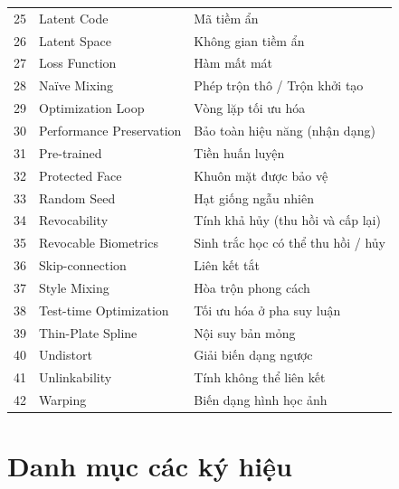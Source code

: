 {\begin{longtable}{r >{\raggedright\arraybackslash}p{5.2cm} >{\raggedright\arraybackslash}p{8.0cm}}
25 & Latent Code & Mã tiềm ẩn \\
26 & Latent Space & Không gian tiềm ẩn \\
27 & Loss Function & Hàm mất mát \\
28 & Na\"ive Mixing & Phép trộn thô / Trộn khởi tạo \\
29 & Optimization Loop & Vòng lặp tối ưu hóa \\
30 & Performance Preservation & Bảo toàn hiệu năng (nhận dạng) \\
31 & Pre-trained & Tiền huấn luyện \\
32 & Protected Face & Khuôn mặt được bảo vệ \\
33 & Random Seed & Hạt giống ngẫu nhiên \\
34 & Revocability & Tính khả hủy (thu hồi và cấp lại) \\
35 & Revocable Biometrics & Sinh trắc học có thể thu hồi / hủy \\
36 & Skip-connection & Liên kết tắt \\
37 & Style Mixing & Hòa trộn phong cách \\
38 & Test-time Optimization & Tối ưu hóa ở pha suy luận \\
39 & Thin-Plate Spline & Nội suy bản mỏng \\
40 & Undistort & Giải biến dạng ngược \\
41 & Unlinkability & Tính không thể liên kết \\
42 & Warping & Biến dạng hình học ảnh \\
\end{longtable}
\addtocounter{table}{-1}
}

\cleardoublepage
\chapter*{Danh mục các ký hiệu}

